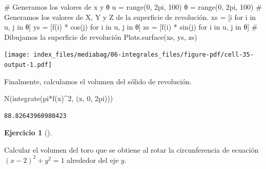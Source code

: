 \documentclass[
  a4paper,
]{scrreport}
\newenvironment{Shaded}{\begin{snugshade}}{\end{snugshade}}
\newcommand{\CommentTok}[1]{\textcolor[rgb]{0.37,0.37,0.37}{#1}}
\newcommand{\FloatTok}[1]{\textcolor[rgb]{0.68,0.00,0.00}{#1}}
\newcommand{\FunctionTok}[1]{\textcolor[rgb]{0.28,0.35,0.67}{#1}}
\newcommand{\KeywordTok}[1]{\textcolor[rgb]{0.00,0.23,0.31}{#1}}
\newcommand{\NormalTok}[1]{\textcolor[rgb]{0.00,0.23,0.31}{#1}}
\newcommand{\OperatorTok}[1]{\textcolor[rgb]{0.37,0.37,0.37}{#1}}
\theoremstyle{definition}
\newtheorem{exercise}{Ejercicio}[chapter]
\theoremstyle{remark}
\begin{document}
\begin{tcolorbox}
\begin{Shaded}
\begin{Highlighting}[]
\CommentTok{\# Generamos los valores de x y θ}
\NormalTok{u }\OperatorTok{=} \FunctionTok{range}\NormalTok{(}\FloatTok{0}\NormalTok{, }\FloatTok{2}\NormalTok{pi, }\FloatTok{100}\NormalTok{)}
\NormalTok{θ }\OperatorTok{=} \FunctionTok{range}\NormalTok{(}\FloatTok{0}\NormalTok{, }\FloatTok{2}\NormalTok{pi, }\FloatTok{100}\NormalTok{)}
\CommentTok{\# Generamos los valores de X, Y y Z de la superficie de revolución.}
\NormalTok{xs }\OperatorTok{=}\NormalTok{ [i for i }\KeywordTok{in}\NormalTok{ u, j }\KeywordTok{in}\NormalTok{ θ]}
\NormalTok{ys }\OperatorTok{=}\NormalTok{ [}\FunctionTok{f}\NormalTok{(i) }\OperatorTok{*} \FunctionTok{cos}\NormalTok{(j) for i }\KeywordTok{in}\NormalTok{ u, j }\KeywordTok{in}\NormalTok{ θ]}
\NormalTok{zs }\OperatorTok{=}\NormalTok{ [}\FunctionTok{f}\NormalTok{(i) }\OperatorTok{*} \FunctionTok{sin}\NormalTok{(j) for i }\KeywordTok{in}\NormalTok{ u, j }\KeywordTok{in}\NormalTok{ θ]}
\CommentTok{\# Dibujamos la superficie de revolución}
\NormalTok{Plots.}\FunctionTok{surface}\NormalTok{(xs, ys, zs)}
\end{Highlighting}
\end{Shaded}

\texttt{[image: index\_files/mediabag/06-integrales\_files/figure-pdf/cell-35-output-1.pdf]}

Finalmente, calculamos el volumen del sólido de revolución.

\begin{Shaded}
\begin{Highlighting}[]
\FunctionTok{N}\NormalTok{(}\FunctionTok{integrate}\NormalTok{(}\FunctionTok{pi*f}\NormalTok{(x)}\OperatorTok{\^{}}\FloatTok{2}\NormalTok{, (x, }\FloatTok{0}\NormalTok{, }\FloatTok{2}\NormalTok{pi)))}
\end{Highlighting}
\end{Shaded}

\begin{verbatim}
88.82643960980423
\end{verbatim}

\end{tcolorbox}

\begin{exercise}[]\protect\hypertarget{exr-solido-revolucion-envolventes}{}\label{exr-solido-revolucion-envolventes}

Calcular el volumen del toro que se obtiene al rotar la circunferencia
de ecuación \((x-2)^2+y^2=1\) alrededor del eje \(y\).

\end{exercise}
\end{document}
